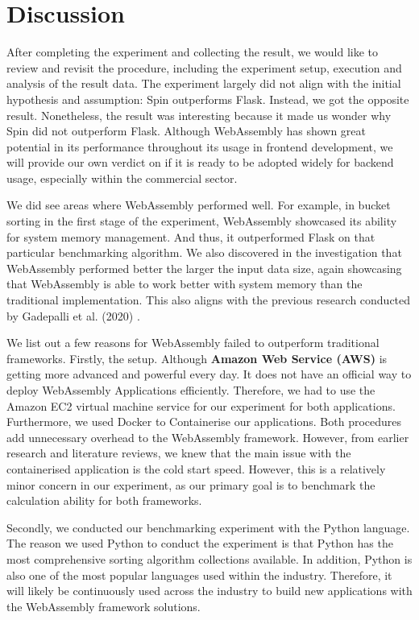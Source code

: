 \chapter{Discussion} \label{chap:discussion}

After completing the experiment and collecting the result, we would like to review and revisit the procedure, including the experiment setup, execution and analysis of the result data. The experiment largely did not align with the initial hypothesis and assumption: Spin outperforms Flask. Instead, we got the opposite result. Nonetheless, the result was interesting because it made us wonder why Spin did not outperform Flask. Although WebAssembly has shown great potential in its performance throughout its usage in frontend development, we will provide our own verdict on if it is ready to be adopted widely for backend usage, especially within the commercial sector.

We did see areas where WebAssembly performed well. For example, in bucket sorting in the first stage of the experiment, WebAssembly showcased its ability for system memory management. And thus, it outperformed Flask on that particular benchmarking algorithm. We also discovered in the investigation that WebAssembly performed better the larger the input data size, again showcasing that WebAssembly is able to work better with system memory than the traditional implementation. This also aligns with the previous research conducted by Gadepalli et al. (2020) \cite{lit34}.

We list out a few reasons for WebAssembly failed to outperform traditional frameworks. Firstly, the setup. Although \textbf{Amazon Web Service (AWS)} is getting more advanced and powerful every day. It does not have an official way to deploy WebAssembly Applications efficiently. Therefore, we had to use the Amazon EC2 virtual machine service for our experiment for both applications. Furthermore, we used Docker to Containerise our applications. Both procedures add unnecessary overhead to the WebAssembly framework. However, from earlier research and literature reviews, we knew that the main issue with the containerised application is the cold start speed. However, this is a relatively minor concern in our experiment, as our primary goal is to benchmark the calculation ability for both frameworks.

Secondly, we conducted our benchmarking experiment with the Python language. The reason we used Python to conduct the experiment is that Python has the most comprehensive sorting algorithm collections available. In addition, Python is also one of the most popular languages used within the industry. Therefore, it will likely be continuously used across the industry to build new applications with the WebAssembly framework solutions.

